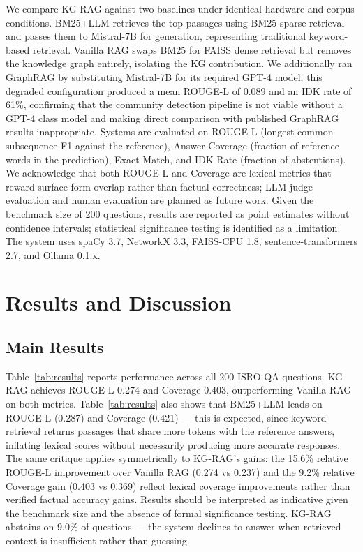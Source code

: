 \documentclass[conference]{IEEEtran}
\begin{document}
We compare KG-RAG against two baselines under identical hardware and corpus conditions. BM25+LLM retrieves the top passages using BM25 sparse retrieval and passes them to Mistral-7B for generation, representing traditional keyword-based retrieval. Vanilla RAG swaps BM25 for FAISS dense retrieval but removes the knowledge graph entirely, isolating the KG contribution. We additionally ran GraphRAG \cite{edge2024graphrag} by substituting Mistral-7B for its required GPT-4 model; this degraded configuration produced a mean ROUGE-L of 0.089 and an IDK rate of 61\%, confirming that the community detection pipeline is not viable without a GPT-4 class model and making direct comparison with published GraphRAG results inappropriate. Systems are evaluated on ROUGE-L (longest common subsequence F1 against the reference), Answer Coverage (fraction of reference words in the prediction), Exact Match, and IDK Rate (fraction of abstentions). We acknowledge that both ROUGE-L and Coverage are lexical metrics that reward surface-form overlap rather than factual correctness; LLM-judge evaluation and human evaluation are planned as future work. Given the benchmark size of 200 questions, results are reported as point estimates without confidence intervals; statistical significance testing is identified as a limitation. The system uses spaCy 3.7, NetworkX 3.3, FAISS-CPU 1.8, sentence-transformers 2.7, and Ollama 0.1.x.

\section{Results and Discussion}
\label{sec:results}

\subsection{Main Results}

Table~\ref{tab:results} reports performance across all 200 ISRO-QA questions. KG-RAG achieves ROUGE-L 0.274 and Coverage 0.403, outperforming Vanilla RAG on both metrics. Table~\ref{tab:results} also shows that BM25+LLM leads on ROUGE-L (0.287) and Coverage (0.421) — this is expected, since keyword retrieval returns passages that share more tokens with the reference answers, inflating lexical scores without necessarily producing more accurate responses. The same critique applies symmetrically to KG-RAG's gains: the 15.6\% relative ROUGE-L improvement over Vanilla RAG (0.274 vs 0.237) and the 9.2\% relative Coverage gain (0.403 vs 0.369) reflect lexical coverage improvements rather than verified factual accuracy gains. Results should be interpreted as indicative given the benchmark size and the absence of formal significance testing. KG-RAG abstains on 9.0\% of questions — the system declines to answer when retrieved context is insufficient rather than guessing.
\end{document}
